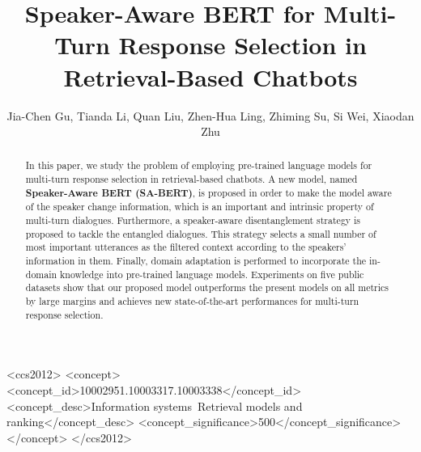\documentclass[sigconf]{acmart}
\begin{document}
\fancyhead{}



\title{Speaker-Aware BERT for Multi-Turn Response Selection in Retrieval-Based Chatbots}



\author{Jia-Chen Gu, Tianda Li, Quan Liu, Zhen-Hua Ling, Zhiming Su, Si Wei, Xiaodan Zhu}




\begin{abstract}
  In this paper, we study the problem of employing pre-trained language models for multi-turn response selection in retrieval-based chatbots.
  A new model, named \textbf{Speaker-Aware BERT (SA-BERT)}, is proposed in order to make the model aware of the speaker change information, which is an important and intrinsic property of multi-turn dialogues.
  Furthermore, a speaker-aware disentanglement strategy is proposed to tackle the entangled dialogues.
  This strategy selects a small number of most important utterances as the filtered context according to the speakers' information in them.
  Finally, domain adaptation is performed to incorporate the in-domain knowledge into pre-trained language models.
  Experiments on five public datasets show that our proposed model outperforms the present models on all metrics by large margins and achieves new state-of-the-art performances for multi-turn response selection.
\end{abstract}

\begin{CCSXML}
<ccs2012>
<concept>
<concept_id>10002951.10003317.10003338</concept_id>
<concept_desc>Information systems~Retrieval models and ranking</concept_desc>
<concept_significance>500</concept_significance>
</concept>
</ccs2012>
\end{CCSXML}

\end{document}
